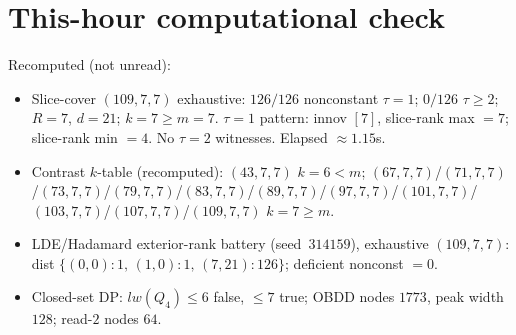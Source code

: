 \documentclass[11pt]{article}
\begin{document}
\section*{This-hour computational check}
Recomputed (not unread):
\begin{itemize}
\item Slice-cover $(109,7,7)$ exhaustive: $126/126$ nonconstant $\tau{=}1$;
  $0/126$ $\tau{\ge}2$; $R{=}7$, $d{=}21$; $k{=}7{\ge}m{=}7$.
  $\tau{=}1$ pattern: innov $[7]$, slice-rank max $=7$; slice-rank min $=4$.
  No $\tau{=}2$ witnesses. Elapsed $\approx1.15$s.
\item Contrast $k$-table (recomputed): $(43,7,7)$ $k{=}6{<}m$;
  $(67,7,7)$/$(71,7,7)$/$(73,7,7)$/$(79,7,7)$/$(83,7,7)$/$(89,7,7)$/$(97,7,7)$/$(101,7,7)$/$(103,7,7)$/$(107,7,7)$/$(109,7,7)$ $k{=}7{\ge}m$.
\item LDE/Hadamard exterior-rank battery (seed~$314159$), exhaustive $(109,7,7)$:
  dist $\{(0,0){:}1,\,(1,0){:}1,\,(7,21){:}126\}$; deficient nonconst $=0$.
\item Closed-set DP: $lw(Q_4)\le6$ false, $\le7$ true; OBDD nodes $1773$, peak width $128$;
  read-$2$ nodes $64$.
\end{itemize}
\end{document}

